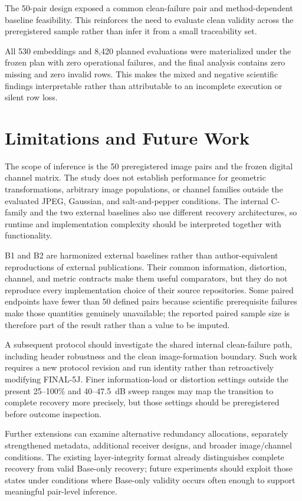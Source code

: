 The 50-pair design exposed a common clean-failure pair and method-dependent baseline feasibility. This reinforces the need to evaluate clean validity across the preregistered sample rather than infer it from a small traceability set.

All 530 embeddings and 8,420 planned evaluations were materialized under the frozen plan with zero operational failures, and the final analysis contains zero missing and zero invalid rows. This makes the mixed and negative scientific findings interpretable rather than attributable to an incomplete execution or silent row loss.

\section{Limitations and Future Work}

The scope of inference is the 50 preregistered image pairs and the frozen digital channel matrix. The study does not establish performance for geometric transformations, arbitrary image populations, or channel families outside the evaluated JPEG, Gaussian, and salt-and-pepper conditions. The internal C-family and the two external baselines also use different recovery architectures, so runtime and implementation complexity should be interpreted together with functionality.

B1 and B2 are harmonized external baselines rather than author-equivalent reproductions of external publications. Their common information, distortion, channel, and metric contracts make them useful comparators, but they do not reproduce every implementation choice of their source repositories. Some paired endpoints have fewer than 50 defined pairs because scientific prerequisite failures make those quantities genuinely unavailable; the reported paired sample size is therefore part of the result rather than a value to be imputed.

A subsequent protocol should investigate the shared internal clean-failure path, including header robustness and the clean image-formation boundary. Such work requires a new protocol revision and run identity rather than retroactively modifying FINAL-5J. Finer information-load or distortion settings outside the present 25--100\% and 40--47.5~dB sweep ranges may map the transition to complete recovery more precisely, but those settings should be preregistered before outcome inspection.

Further extensions can examine alternative redundancy allocations, separately strengthened metadata, additional receiver designs, and broader image/channel conditions. The existing layer-integrity format already distinguishes complete recovery from valid Base-only recovery; future experiments should exploit those states under conditions where Base-only validity occurs often enough to support meaningful pair-level inference.

